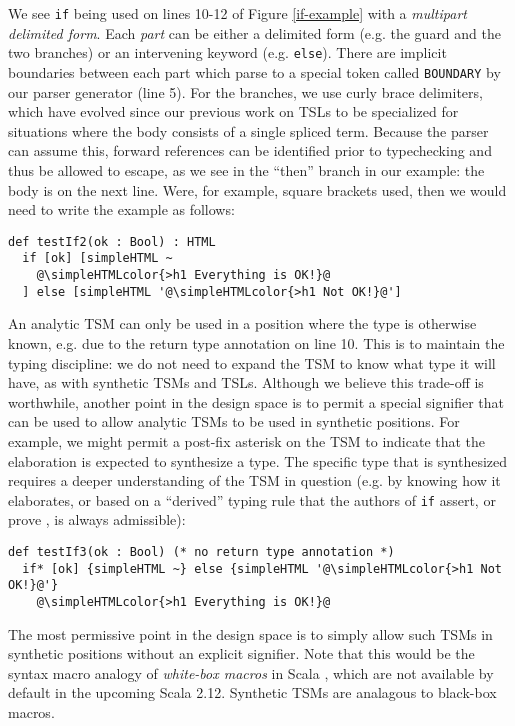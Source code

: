 \documentclass{sig-alternate}
\newcommand{\simpleHTMLcolor}[1]{\textcolor[HTML]{7D5100}{#1}}
\begin{document}
We see \verb|if| being used on lines 10-12 of Figure \ref{if-example} with a \emph{multipart delimited form}. Each \emph{part} can be either a delimited form (e.g. the guard and the two branches) or an intervening keyword (e.g. \verb|else|). There are implicit boundaries between each part which parse to  a special token called \verb|BOUNDARY| by our parser generator (line 5). For the branches, we use curly brace delimiters, which have evolved since our previous work on TSLs to be specialized for situations where the body consists of a single spliced term. Because the parser can assume this, forward references can be identified prior to typechecking and thus be allowed to escape, as we see in the ``then'' branch in our example: the body is on the next line. Were, for example, square brackets used, then we would need to write the example as follows:

\begin{lstlisting}[style=wyvern]
def testIf2(ok : Bool) : HTML
  if [ok] [simpleHTML ~
    @\simpleHTMLcolor{>h1 Everything is OK!}@
  ] else [simpleHTML '@\simpleHTMLcolor{>h1 Not OK!}@']
\end{lstlisting}

An analytic TSM can only be used in a position where the type is otherwise known, e.g. due to the return type annotation on line 10. This is to maintain the typing discipline: we do not need to expand the TSM to know what type it will have, as with synthetic TSMs and TSLs. Although we believe this trade-off is worthwhile, another point in the design space is to permit a special signifier that can be used to allow analytic TSMs to be used in synthetic positions. For example, we might permit a post-fix asterisk on the TSM to indicate that the elaboration is expected to synthesize a type. The specific type that is synthesized requires a deeper understanding of the TSM in question (e.g. by knowing how it elaborates, or based on a ``derived'' typing rule that the authors of \verb|if| assert, or prove \cite{conf/icfp/LorenzenE13}, is always admissible):

\begin{lstlisting}[style=wyvern]
def testIf3(ok : Bool) (* no return type annotation *)
  if* [ok] {simpleHTML ~} else {simpleHTML '@\simpleHTMLcolor{>h1 Not OK!}@'}
    @\simpleHTMLcolor{>h1 Everything is OK!}@
\end{lstlisting}

The most permissive point in the design space is to simply allow such TSMs in synthetic positions without an explicit signifier. Note that this would be the syntax macro analogy of \emph{white-box  macros} in Scala \cite{ScalaMacros2013}, which are not  available by default in the upcoming Scala 2.12. Synthetic TSMs are analagous to black-box macros. 
\end{document}
